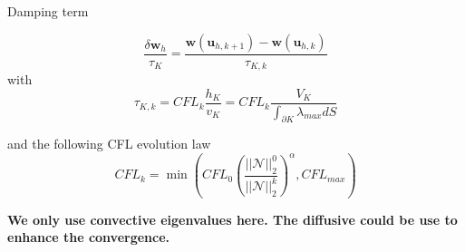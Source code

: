 \documentclass[24pt,t,table, aspectratio=169]{beamer}
\newcommand{\vecu}{\mathbf{u}}
\newcommand{\vecw}{\mathbf{w}}
\begin{document}
\begin{frame}{Damping term}

\begin{equation*}
\frac{\delta \vecw_h}{\tau_K} = \frac{\vecw(\vecu_{h,k+1}) - \vecw(\vecu_{h,k})}{\tau_{K,k}}
\end{equation*}
with
\begin{equation*}
\tau_{K,k} = CFL_k \frac{h_K}{v_K} = CFL_k \frac{V_K}{\int_{\partial K} \lambda_{max} dS}
\end{equation*}

and the following CFL evolution law
\begin{equation*}
CFL_k = \min\left(CFL_0 \left(\frac{||\mathcal{N}||_2^0}{||\mathcal{N}||_2^k}\right)^\alpha, CFL_{max}\right)
\end{equation*}

{
\begin{framed}
\centering
\textbf{We only use convective eigenvalues here. The diffusive could be use to enhance the convergence.}
\end{framed}
}

\end{frame}
\end{document}
